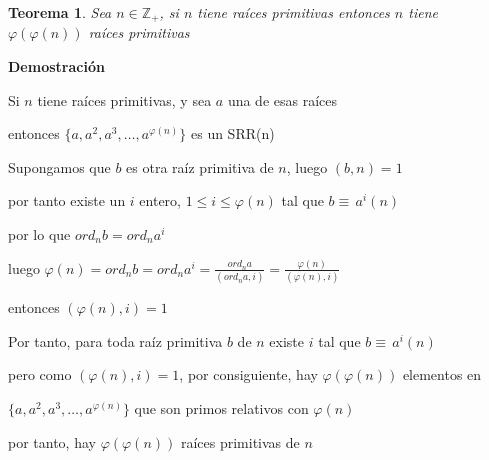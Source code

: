 \documentclass[a4paper,12pt]{report}
\newtheorem*{teo}{Teorema}
\begin{document}
\begin{teo}
 Sea $n\in\mathbb{Z}_+$, si $n$ tiene raíces primitivas entonces $n$ tiene $\varphi(\varphi(n))$ raíces primitivas
\end{teo}

\textbf{Demostración}

Si $n$ tiene raíces primitivas, y sea $a$ una de esas raíces

entonces $\{a,a^2,a^3,\dots,a^{\varphi(n)}\}$ es un SRR(n)

Supongamos que $b$ es otra raíz primitiva de $n$, luego $(b,n)=1$

por tanto existe un $i$ entero, $1\leq i \leq \varphi(n)$  tal que $b \equiv \, a^i (n)$

por lo que $ord_nb=ord_na^i$ 

luego $\varphi(n)=ord_nb=ord_na^i=\frac{ord_na}{(ord_na,i)}=\frac{\varphi(n)}{(\varphi(n),i)}$ 

entonces $(\varphi(n),i) =1$

Por tanto, para toda raíz primitiva $b$ de $n$ existe $i$ tal que $b \equiv \, a^i (n)$ 

pero como $(\varphi(n),i) =1$, por consiguiente, hay $\varphi(\varphi(n))$ elementos en

$\{a,a^2,a^3,\dots,a^{\varphi(n)}\}$ que son primos relativos con $\varphi(n)$

por tanto, hay $\varphi(\varphi(n))$ raíces primitivas de $n$
\end{document}
